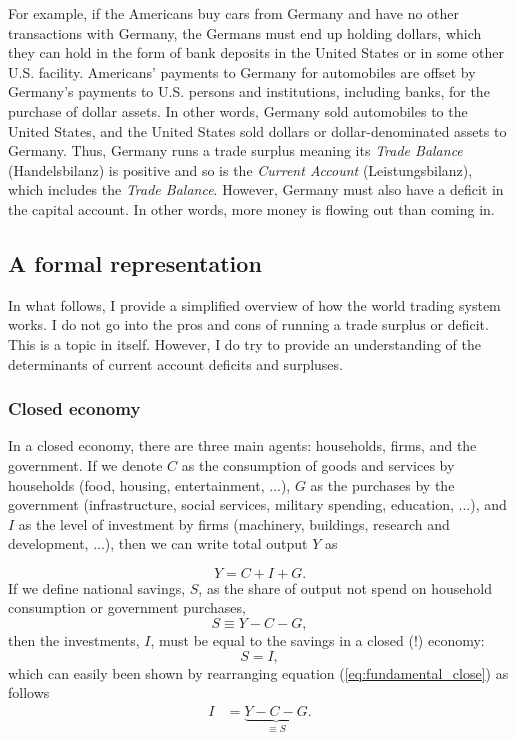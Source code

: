 For example, if the Americans buy cars from Germany and have no other transactions with Germany, the Germans must end up holding dollars, which they can hold in the form of bank deposits in the United States or in some other U.S. facility. Americans' payments to Germany for automobiles are offset by Germany's payments to U.S. persons and institutions, including banks, for the purchase of dollar assets. In other words, Germany sold automobiles to the United States, and the United States sold dollars or dollar-denominated assets to Germany.
Thus, Germany runs a trade surplus meaning its \textit{Trade Balance} (Handelsbilanz) is positive and so is the \textit{Current Account} (Leistungsbilanz), which includes the \textit{Trade Balance}. 
However, Germany must also have a deficit in the capital account. In other words, more money is flowing out than coming in. 

\pbn
\subsection{A formal representation}
In what follows, I provide a simplified overview of how the world trading system works. I do not go into the pros and cons of running a trade surplus or deficit. This is a topic in itself. However, I do try to provide an understanding of the determinants of current account deficits and surpluses. 

\subsubsection*{Closed economy}
In a closed economy, there are three main agents: households, firms, and the government. If we denote $C$ as the consumption of goods and services by households (food, housing, entertainment, ...), $G$ as the purchases by the government (infrastructure, social services, military spending, education, ...), and $I$ as the level of investment by firms (machinery, buildings, research and development, ...), then we can write total output $Y$ as 

\begin{equation}
	Y=C+I+G.\label{eq:fundamental_close}
\end{equation}
If we define national savings, $S$, as the share of output not spend on household consumption or government purchases, \[S\equiv Y-C-G,\]
then the investments, $I$, must be equal to the savings in a closed (!) economy:
\[S=I,\] 
which can easily been shown by rearranging equation (\ref{eq:fundamental_close}) as follows
\begin{align*}
	I&=\underbrace{Y-C-G}_{\equiv S}.
\end{align*}

